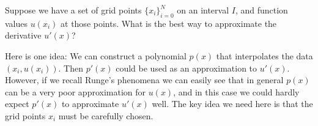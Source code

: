 \label{lab:pseudospectral1}

Suppose we have a set of grid points $\{x_i\}_{i=0}^N$ on an interval $I$, and function values $u(x_i)$ at those points.
What is the best way to approximate the derivative $u'(x)$?

Here is one idea: We can construct a polynomial $p(x)$ that interpolates the data $(x_i,u(x_i))$.
Then $p'(x)$ could be used as an approximation to $u'(x)$.
However, if we recall Runge's phenomena we can easily see that in general $p(x)$ can be a very poor approximation for $u(x)$, and in this case we could hardly expect $p'(x)$ to approximate $u'(x)$ well. 
The key idea we need here is that the grid points $x_i$ must be carefully chosen.

